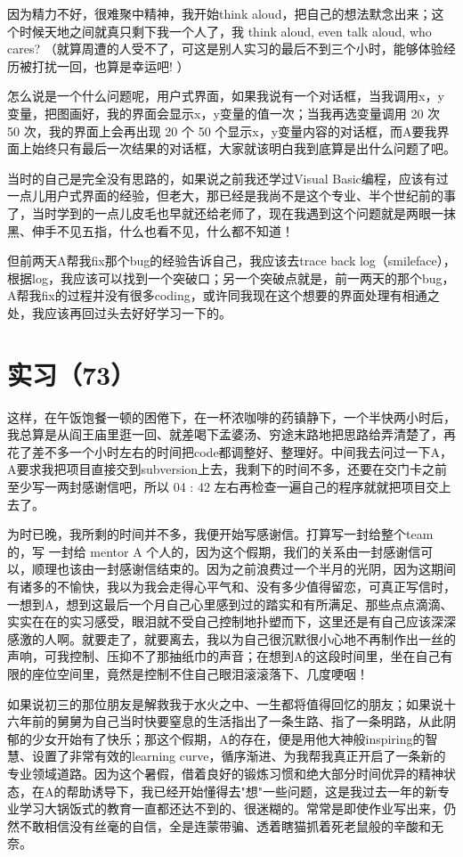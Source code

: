 \documentclass[12pt]{book}
\begin{document}
因为精力不好，很难聚中精神，我开始think aloud，把自己的想法默念出来；这个时候天地之间就真只剩下我一个人了，我 think aloud, even talk aloud, who cares? （就算周遭的人受不了，可这是别人实习的最后不到三个小时，能够体验经历被打扰一回，也算是幸运吧! ）

怎么说是一个什么问题呢，用户式界面，如果我说有一个对话框，当我调用x，y变量，把图画好，我的界面会显示x，y变量的值一次；当我再选变量调用 20 次 50 次，我的界面上会再出现 20 个 50 个显示x，y变量内容的对话框，而A要我界面上始终只有最后一次结果的对话框，大家就该明白我到底算是出什么问题了吧。

当时的自己是完全没有思路的，如果说之前我还学过Visual Basic编程，应该有过一点儿用户式界面的经验，但老大，那已经是我尚不是这个专业、半个世纪前的事了，当时学到的一点儿皮毛也早就还给老师了，现在我遇到这个问题就是两眼一抹黑、伸手不见五指，什么也看不见，什么都不知道！

但前两天A帮我fix那个bug的经验告诉自己，我应该去trace back log（smileface），根据log，我应该可以找到一个突破口；另一个突破点就是，前一两天的那个bug，A帮我fix的过程并没有很多coding，或许同我现在这个想要的界面处理有相通之处，我应该再回过头去好好学习一下的。　


\section{实习（73）　}
\label{sec-5-76}

这样，在午饭饱餐一顿的困倦下，在一杯浓咖啡的药镇静下，一个半快两小时后，我总算是从阎王庙里逛一回、就差喝下孟婆汤、穷途末路地把思路给弄清楚了，再花了差不多一个小时左右的时间把code都调整好、整理好。中间我去问过一下A，A要求我把项目直接交到subversion上去，我剩下的时间不多，还要在交门卡之前至少写一两封感谢信吧，所以 04 : 42 左右再检查一遍自己的程序就就把项目交上去了。　

为时已晚，我所剩的时间并不多，我便开始写感谢信。打算写一封给整个team的，写 一封给 mentor A 个人的，因为这个假期，我们的关系由一封感谢信可以，顺理也该由一封感谢信结束的。因为之前浪费过一个半月的光阴，因为这期间有诸多的不愉快，我以为我会走得心平气和、没有多少值得留恋，可真正写信时，一想到A，想到这最后一个月自己心里感到过的踏实和有所满足、那些点点滴滴、实实在在的实习感受，眼泪就不受自己控制地扑塑而下，这里还是有自己应该深深感激的人啊。就要走了，就要离去，我以为自己很沉默很小心地不再制作出一丝的声响，可我控制、压抑不了那抽纸巾的声音；在想到A的这段时间里，坐在自己有限的座位空间里，竟然是控制不住自己眼泪滚滚落下、几度哽咽！

如果说初三的那位朋友是解救我于水火之中、一生都将值得回忆的朋友；如果说十六年前的舅舅为自己当时快要窒息的生活指出了一条生路、指了一条明路，从此阴郁的少女开始有了快乐；那这个假期，A的存在，便是用他大神般inspiring的智慧、设置了非常有效的learning curve，循序渐进、为我帮我真正开启了一条新的专业领域道路。因为这个暑假，借着良好的锻炼习惯和绝大部分时间优异的精神状态，在A的帮助诱导下，我已经开始懂得去"想"一些问题，这是我过去一年的新专业学习大锅饭式的教育一直都还达不到的、很迷糊的。常常是即使作业写出来，仍然不敢相信没有丝毫的自信，全是连蒙带骗、透着瞎猫抓着死老鼠般的辛酸和无奈。
\end{document}
